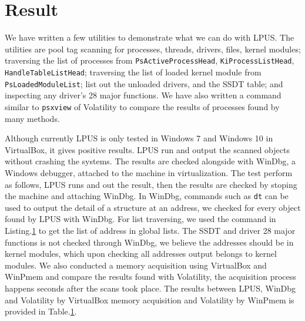 \section[Result]{Result}

We have written a few utilities to demonstrate what we can do with LPUS. The
utilities are pool tag scanning for processes, threads, drivers, files, kernel
modules; traversing the list of processes from \texttt{PsActiveProcessHead},
\texttt{KiProcessListHead}, \texttt{HandleTableListHead}; traversing the list
of loaded kernel module from \texttt{PsLoadedModuleList}; list out the unloaded
drivers, and the SSDT table; and inspecting any driver's 28 major functions.
We have also written a command similar to \texttt{psxview} of Volatility to
compare the results of processes found by many methods.

Although currently LPUS is only tested in Windows 7 and Windows 10 in
VirtualBox, it gives positive results. LPUS run and output the scanned objects
without crashing the systems. The results are checked alongside with WinDbg, a
Windows debugger, attached to the machine in virtualization. The test perform
as follows, LPUS runs and out the result, then the results are checked by
stoping the machine and attaching WinDbg. In WinDbg, commands such as
\texttt{dt} can be used to output the detail of a structure at an address, we
checked for every object found by LPUS with WinDbg. For list traversing, we
used the command in Listing.\ref{} to get the list of address in global lists.
The SSDT and driver 28 major functions is not checked through WinDbg, we
believe the addresses should be in kernel modules, which upon checking all
addresses output belongs to kernel modules. We also conducted a memory
acquisition using VirtualBox and WinPmem and compare the results found with
Volatility, the acquisition process happens seconds after the scans took place.
The results between LPUS, WinDbg and Volatility by VirtualBox memory
acquisition and Volatility by WinPmem is provided in Table.\ref{}.

